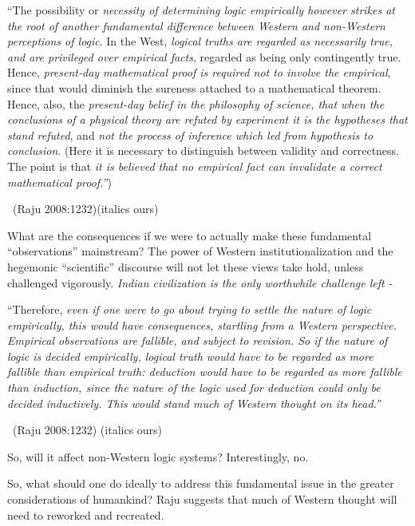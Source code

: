\begin{myquote}
“The possibility or \textit{necessity of determining logic empirically however strikes at the root of another fundamental difference between Western and non-Western perceptions of logic}. In the West, \textit{logical truths are regarded as necessarily true, and are privileged over empirical facts}, regarded as being only contingently true. Hence, \textit{present-day mathematical proof is required not to involve the empirical}, since that would diminish the sureness attached to a mathematical theorem. Hence, also, the \textit{present-day belief in the philosophy of science, that when the conclusions of a physical theory are refuted by experiment it is the hypotheses that stand refuted}, and \textit{not the process of inference which led from hypothesis to conclusion}. (Here it is necessary to distinguish between validity and correctness. The point is that \textit{it is believed that no empirical fact can invalidate a correct mathematical proof.”}) 

~\hfill (Raju 2008:1232)(italics ours)
\end{myquote}

What are the consequences if we were to actually make these fundamental “observations” mainstream? The power of Western institutionalization and the hegemonic “scientific” discourse will not let these views take hold, unless challenged vigorously. \textit{Indian civilization is the only worthwhile challenge left -}

\begin{myquote}
“Therefore, \textit{even if one were to go about trying to settle the nature of logic empirically, this would have consequences, startling from a Western perspective. Empirical observations are fallible, and subject to revision. So if the nature of logic is decided empirically, logical truth would have to be regarded as more fallible than empirical truth: deduction would have to be regarded as more fallible than induction, since the nature of the logic used for deduction could only be decided inductively. This would stand much of Western thought on its head.”} 

~\hfill (Raju 2008:1232) (italics ours)
\end{myquote}

So, will it affect non-Western logic systems? Interestingly, no.

So, what should one do ideally to address this fundamental issue in the greater considerations of humankind? Raju suggests that much of Western thought will need to reworked and recreated.

